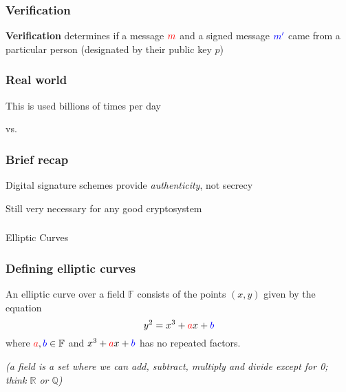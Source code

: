 \documentclass{beamer} %
\theoremstyle{definition} %
\begin{document}
\begin{frame}

\frametitle{Verification}

\textbf{Verification} determines if a message $\textcolor{red}{m}$ and a signed message $\textcolor{blue}{m'}$ came from a particular person (designated by their public key $p$)

\begin{center}
\end{center}

\end{frame}

\begin{frame}

\frametitle{Real world}

This is used billions of times per day

\begin{center}

vs. 

\end{center}

\end{frame}

\begin{frame}
\frametitle{Brief recap}

Digital signature schemes provide \emph{authenticity}, not secrecy

Still very necessary for any good cryptosystem

\end{frame}


\begin{frame}
\frametitle{\;}

\begin{center}
\Large{Elliptic Curves}
\end{center}

\end{frame}

\begin{frame}

\frametitle{Defining elliptic curves}
\begin{definition}
An elliptic curve over a field $\mathbb{F}$ consists of the points $(x,y)$ given by the equation
\[
	y^2 = x^3 + \textcolor{red}{a}x + \textcolor{blue}{b}
\]
where $\textcolor{red}{a},\textcolor{blue}{b} \in \mathbb{F}$ and $x^3 + \textcolor{red}{a}x + \textcolor{blue}{b}$ has no repeated factors.
\end{definition}

\scriptsize{\emph{(a field is a set where we can add, subtract, multiply and divide except for 0; think $\mathbb{R}$ or $\mathbb{Q}$)}}


\end{frame}
\end{document}
